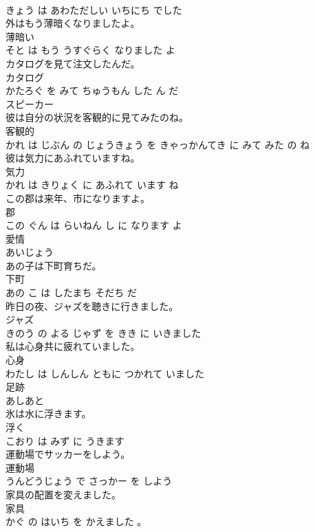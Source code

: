 \documentclass[8pt]{extreport}
\begin{document}
\begin{CJK}{UTF8}{min}
\\	きょう は あわただしい いちにち でした			
\\	外はもう薄暗くなりましたよ。	
\\	薄暗い 
\\	そと は もう うすぐらく なりました よ			
\\	カタログを見て注文したんだ。	
\\	カタログ 
\\	かたろぐ を みて ちゅうもん した ん だ			
\\	スピーカー	
\\	彼は自分の状況を客観的に見てみたのね。	
\\	客観的 
\\	かれ は じぶん の じょうきょう を きゃっかんてき に みて みた の ね			
\\	彼は気力にあふれていますね。	
\\	気力 
\\	かれ は きりょく に あふれて います ね			
\\	この郡は来年、市になりますよ。	
\\	郡 
\\	この ぐん は らいねん し に なります よ			
\\	愛情	
\\	あいじょう			
\\	あの子は下町育ちだ。	
\\	下町 
\\	あの こ は したまち そだち だ			
\\	昨日の夜、ジャズを聴きに行きました。	
\\	ジャズ 
\\	きのう の よる じゃず を きき に いきました			
\\	私は心身共に疲れていました。	
\\	心身 
\\	わたし は しんしん ともに つかれて いました			
\\	足跡	
\\	あしあと			
\\	氷は水に浮きます。	
\\	浮く 
\\	こおり は みず に うきます			
\\	運動場でサッカーをしよう。	
\\	運動場 
\\	うんどうじょう で さっかー を しよう			
\\	家具の配置を変えました。	
\\	家具 
\\	かぐ の はいち を かえました 。			

\end{CJK}
\end{document}
